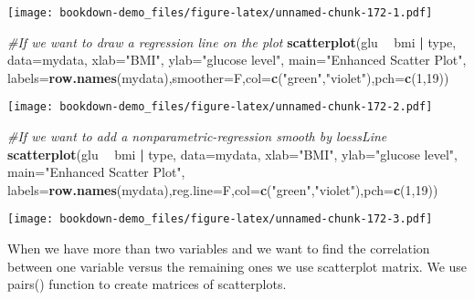 \documentclass[]{book}
\newenvironment{Shaded}{\begin{snugshade}}{\end{snugshade}}
\newcommand{\KeywordTok}[1]{\textcolor[rgb]{0.13,0.29,0.53}{\textbf{#1}}}
\newcommand{\DataTypeTok}[1]{\textcolor[rgb]{0.13,0.29,0.53}{#1}}
\newcommand{\DecValTok}[1]{\textcolor[rgb]{0.00,0.00,0.81}{#1}}
\newcommand{\StringTok}[1]{\textcolor[rgb]{0.31,0.60,0.02}{#1}}
\newcommand{\CommentTok}[1]{\textcolor[rgb]{0.56,0.35,0.01}{\textit{#1}}}
\newcommand{\OperatorTok}[1]{\textcolor[rgb]{0.81,0.36,0.00}{\textbf{#1}}}
\newcommand{\NormalTok}[1]{#1}
\theoremstyle{definition}
\theoremstyle{definition}
\theoremstyle{definition}
\theoremstyle{remark}
\begin{document}
\texttt{[image: bookdown-demo\_files/figure-latex/unnamed-chunk-172-1.pdf]}

\begin{Shaded}
\begin{Highlighting}[]
\CommentTok{#If we want to draw a regression line on the plot}
\KeywordTok{scatterplot}\NormalTok{(glu }\OperatorTok{~}\StringTok{ }\NormalTok{bmi }\OperatorTok{|}\StringTok{ }\NormalTok{type, }\DataTypeTok{data=}\NormalTok{mydata, }
    \DataTypeTok{xlab=}\StringTok{"BMI"}\NormalTok{, }\DataTypeTok{ylab=}\StringTok{"glucose level"}\NormalTok{, }
   \DataTypeTok{main=}\StringTok{"Enhanced Scatter Plot"}\NormalTok{, }
   \DataTypeTok{labels=}\KeywordTok{row.names}\NormalTok{(mydata),}\DataTypeTok{smoother=}\NormalTok{F,}\DataTypeTok{col=}\KeywordTok{c}\NormalTok{(}\StringTok{"green"}\NormalTok{,}\StringTok{"violet"}\NormalTok{),}\DataTypeTok{pch=}\KeywordTok{c}\NormalTok{(}\DecValTok{1}\NormalTok{,}\DecValTok{19}\NormalTok{))}
\end{Highlighting}
\end{Shaded}

\texttt{[image: bookdown-demo\_files/figure-latex/unnamed-chunk-172-2.pdf]}

\begin{Shaded}
\begin{Highlighting}[]
\CommentTok{#If we want to add a nonparametric-regression smooth by loessLine}
\KeywordTok{scatterplot}\NormalTok{(glu }\OperatorTok{~}\StringTok{ }\NormalTok{bmi }\OperatorTok{|}\StringTok{ }\NormalTok{type, }\DataTypeTok{data=}\NormalTok{mydata, }
    \DataTypeTok{xlab=}\StringTok{"BMI"}\NormalTok{, }\DataTypeTok{ylab=}\StringTok{"glucose level"}\NormalTok{, }
   \DataTypeTok{main=}\StringTok{"Enhanced Scatter Plot"}\NormalTok{, }
   \DataTypeTok{labels=}\KeywordTok{row.names}\NormalTok{(mydata),}\DataTypeTok{reg.line=}\NormalTok{F,}\DataTypeTok{col=}\KeywordTok{c}\NormalTok{(}\StringTok{"green"}\NormalTok{,}\StringTok{"violet"}\NormalTok{),}\DataTypeTok{pch=}\KeywordTok{c}\NormalTok{(}\DecValTok{1}\NormalTok{,}\DecValTok{19}\NormalTok{))}
\end{Highlighting}
\end{Shaded}

\texttt{[image: bookdown-demo\_files/figure-latex/unnamed-chunk-172-3.pdf]}

When we have more than two variables and we want to find the correlation
between one variable versus the remaining ones we use scatterplot
matrix. We use pairs() function to create matrices of scatterplots.
\end{document}
